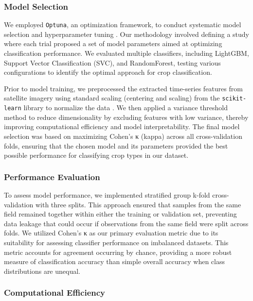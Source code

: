 \documentclass[
  journal,
  twocolumn]{IEEEtran}
\begin{document}
\subsubsection{Model Selection}\label{model-selection}

We employed \texttt{Optuna}, an optimization framework, to conduct
systematic model selection and hyperparameter tuning
\citep{optuna_2019}. Our methodology involved defining a study where
each trial proposed a set of model parameters aimed at optimizing
classification performance. We evaluated multiple classifiers, including
LightGBM, Support Vector Classification (SVC), and RandomForest, testing
various configurations to identify the optimal approach for crop
classification.

Prior to model training, we preprocessed the extracted time-series
features from satellite imagery using standard scaling (centering and
scaling) from the \texttt{scikit-learn} library to normalize the data
\citep{scikit-learn}. We then applied a variance threshold method to
reduce dimensionality by excluding features with low variance, thereby
improving computational efficiency and model interpretability. The final
model selection was based on maximizing Cohen's κ (kappa) across all
cross-validation folds, ensuring that the chosen model and its
parameters provided the best possible performance for classifying crop
types in our dataset.

\subsubsection{Performance Evaluation}\label{performance-evaluation}

To assess model performance, we implemented stratified group k-fold
cross-validation with three splits. This approach ensured that samples
from the same field remained together within either the training or
validation set, preventing data leakage that could occur if observations
from the same field were split across folds. We utilized Cohen's κ as
our primary evaluation metric due to its suitability for assessing
classifier performance on imbalanced datasets. This metric accounts for
agreement occurring by chance, providing a more robust measure of
classification accuracy than simple overall accuracy when class
distributions are unequal.

\subsubsection{Computational Efficiency}\label{computational-efficiency}
\end{document}
